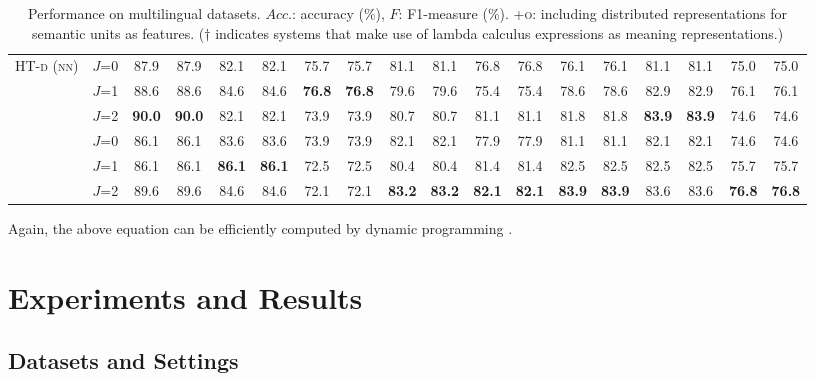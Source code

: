 \documentclass[11pt,a4paper]{article}
\begin{document}
{{\begin{table*}[t!]
{\begin{tabular}{|ll|cc|cc|cc|cc|cc|cc|cc|cc|}
			\multirow{3}{*}{\textsc{HT-d} (\textsc{nn})}  &$J$=0 &  87.9&87.9  &82.1 &82.1 &75.7&75.7 &81.1 &81.1&76.8&76.8&76.1&76.1&81.1&81.1&75.0&75.0\\
			&$J$=1 &88.6  &88.6 &84.6&84.6  &\textbf{76.8} &\textbf{76.8} &79.6 &79.6&75.4&75.4&78.6&78.6&82.9&82.9&76.1&76.1 \\
			&$J$=2 & \textbf{90.0} &\textbf{90.0}  &  82.1&82.1  & 73.9&73.9 &80.7 &80.7&81.1&81.1&{81.8}&{81.8}&{\bf83.9}&{\bf83.9}&74.6&74.6\\
			\hdashline
			\multirow{3}{*}{\textsc{HT-d} (\textsc{nn}+\textsc{o})} &$J$=0 &{86.1}  &{86.1}   & {83.6} &{83.6}   &{73.9} &{73.9}& 82.1& 82.1&77.9&77.9&81.1&81.1&82.1&82.1&74.6&74.6\\
			&$J$=1 &86.1 &86.1  &\textbf{86.1}   & \textbf{86.1}   &72.5 &72.5 &80.4 & 80.4&{81.4}&{81.4}&{82.5}&{82.5}&82.5&82.5&75.7&75.7\\
			&$J$=2 &{89.6}  &{89.6}   &{84.6}  & {84.6}   & {72.1}&{72.1}&\textbf{83.2} &\textbf{83.2}& \textbf{82.1} &\textbf{82.1}& \textbf{83.9}&\textbf{83.9} &{83.6}&{83.6}&\textbf{76.8}&\textbf{76.8}\\
			\hline
		\end{tabular}
	}
	\caption{Performance on multilingual datasets. $Acc.$: accuracy (\%), $F$: F1-measure (\%). +\textsc{o}: including distributed representations for semantic units as features. ($\dagger$ indicates systems that make use of lambda calculus expressions as meaning representations.)}
	\label{tab:model_comparison}
\end{table*}

Again, the above equation can be efficiently computed by dynamic programming \cite{Rhs:17}.
\label{sec:exp}

\section{Experiments and Results}

\subsection{Datasets and Settings}

}}
\end{document}

